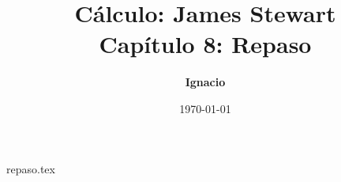 \documentclass[11pt,spanish,oneside]{report}
\title{\textbf{Cálculo: James Stewart} \\ \Large Capítulo 8: Repaso}
\author{\textbf{Ignacio}}
\date{\today}
\begin{document}
\maketitle

{repaso.tex}
\end{document}
